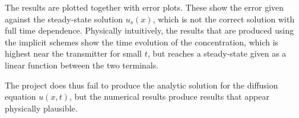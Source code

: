 \documentclass[a4paper,11pt]{article}
\begin{document}
The results are plotted together with error plots. These show the error given against the steady-state solution $u_s(x)$, which is not the correct solution with full time dependence. Physically intuitively, the results that are produced using the implicit schemes show the time evolution of the concentration, which is highest near the transmitter for small $t$, but reaches a steady-state given as a linear function between the two terminals.

The project does thus fail to produce the analytic solution for the diffusion equation $u(x,t)$, but the numerical results produce results that appear physically plausible.



\end{document}
